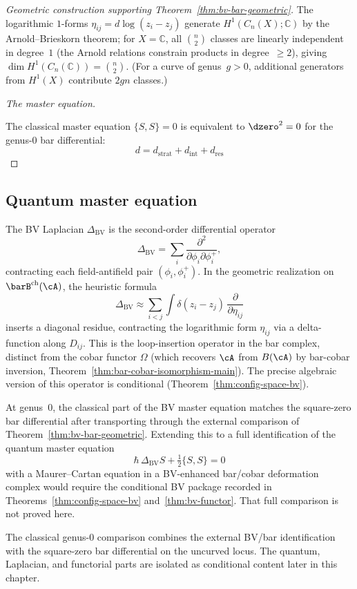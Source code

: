 \begin{proof}[Geometric construction supporting \textup{Theorem~\ref{thm:bv-bar-geometric}}]
The logarithmic $1$-forms $\eta_{ij} = d\log(z_i - z_j)$ generate
$H^1(C_n(X); \mathbb{C})$ by the Arnold--Brieskorn theorem;
for $X = \mathbb{C}$, all $\binom{n}{2}$ classes are linearly independent in degree~$1$
(the Arnold relations constrain products in degree~$\geq 2$), giving
$\dim H^1(C_n(\mathbb{C})) = \binom{n}{2}$. (For a curve of genus~$g > 0$, additional generators from $H^1(X)$ contribute $2gn$ classes.)

\emph{The master equation.}

The classical master equation $\{S, S\} = 0$ is equivalent to $\dzero^2 = 0$ for the
genus-$0$ bar differential:
\[d = d_{\text{strat}} + d_{\text{int}} + d_{\text{res}}\]
\end{proof}

\subsection{Quantum master equation}

\begin{definition}[BV Laplacian]
\label{def:bv-laplacian}
The BV Laplacian $\Delta_{\mathrm{BV}}$ is the second-order differential operator
\[
\Delta_{\mathrm{BV}} = \sum_i \frac{\partial^2}{\partial \phi_i \partial \phi_i^+},
\]
contracting each field-antifield pair $(\phi_i, \phi_i^+)$.
In the geometric realization on $\barB^{\mathrm{ch}}(\cA)$, the heuristic formula
\[
\Delta_{\mathrm{BV}} \approx \sum_{i<j} \int \delta(z_i - z_j)\,
\frac{\partial}{\partial \eta_{ij}}
\]
inserts a diagonal residue, contracting the logarithmic form $\eta_{ij}$ via a
delta-function along $D_{ij}$. This is the loop-insertion operator in the bar
complex, distinct from the cobar functor $\Omega$ (which recovers $\cA$ from
$B(\cA)$ by bar-cobar inversion, Theorem~\ref{thm:bar-cobar-isomorphism-main}).
The precise algebraic version of this operator is conditional
\textup{(}Theorem~\ref{thm:config-space-bv}\textup{)}.
\end{definition}

\begin{remark}
\label{rem:qme-bar-cobar}
At genus~$0$, the classical part of the BV master equation matches the
square-zero bar differential after transporting through the external
comparison of Theorem~\ref{thm:bv-bar-geometric}. Extending this to a
full identification of the quantum master equation
\[
\hbar\,\Delta_{\mathrm{BV}}S + \tfrac{1}{2}\{S,S\}=0
\]
with a Maurer--Cartan equation in a BV-enhanced bar/cobar deformation
complex would require the conditional BV package recorded in
Theorems~\ref{thm:config-space-bv} and~\ref{thm:bv-functor}. That
full comparison is not proved here.

The classical genus-$0$ comparison combines the external BV/bar
identification with the square-zero bar differential on the
uncurved locus. The quantum, Laplacian, and functorial parts are
isolated as conditional content later in this chapter.
\end{remark}

